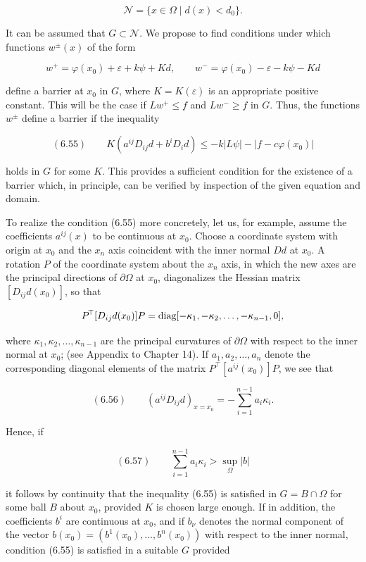 \[
\mathcal{N} = \{x \in \Omega \mid d(x) < d_0\}.
\]

It can be assumed that $G \subset \mathcal{N}$. We propose to find conditions under which functions
$w^\pm(x)$ of the form

\[
w^+ = \varphi(x_0) + \varepsilon + k\psi + Kd, \qquad w^- = \varphi(x_0) - \varepsilon - k\psi - Kd
\]

define a barrier at $x_0$ in $G$, where $K = K(\varepsilon)$ is an appropriate positive constant. This
will be the case if $Lw^+ \leq f$ and $Lw^- \geq f$ in $G$. Thus, the functions $w^\pm$ define a barrier
if the inequality

\[
(6.55) \qquad K(a^{ij}D_{ij}d + b^iD_i d) \leq -k|L\psi| - |f - c\varphi(x_0)|
\]

holds in $G$ for some $K$. This provides a sufficient condition for the existence of a barrier which, in
principle, can be verified by inspection of the given equation and domain.

To realize the condition (6.55) more concretely, let us, for example, assume the coefficients
$a^{ij}(x)$ to be continuous at $x_0$. Choose a coordinate system with origin at $x_0$ and the
$x_n$ axis coincident with the inner normal $Dd$ at $x_0$. A rotation $P$ of the coordinate system
about the $x_n$ axis, in which the new axes are the principal directions of $\partial\Omega$ at $x_0$,
diagonalizes the Hessian matrix $[D_{ij}d(x_0)]$, so that

\[
P^{\!\top}[D_{ij}d(x_0)]P = \operatorname{diag}[-\kappa_1, -\kappa_2, \ldots, -\kappa_{n-1}, 0],
\]

where $\kappa_1, \kappa_2, \ldots, \kappa_{n-1}$ are the principal curvatures of $\partial\Omega$ with respect to the
inner normal at $x_0$; (see Appendix to Chapter 14). If $a_1, a_2, \ldots, a_n$ denote the
corresponding diagonal elements of the matrix $P^{\!\top}[a^{ij}(x_0)]P$, we see that

\[
(6.56) \qquad \left(a^{ij}D_{ij}d\right)_{x=x_0} = -\sum_{i=1}^{n-1} a_i\kappa_i.
\]

Hence, if

\[
(6.57) \qquad \sum_{i=1}^{n-1} a_i\kappa_i > \sup_{\Omega} |b|
\]

it follows by continuity that the inequality (6.55) is satisfied in $G = B \cap \Omega$ for
some ball $B$ about $x_0$, provided $K$ is chosen large enough. If in addition, the coefficients
$b^i$ are continuous at $x_0$, and if $b_\nu$ denotes the normal component of the vector
$b(x_0) = (b^1(x_0), \ldots, b^n(x_0))$ with respect to the inner normal, condition (6.55)
is satisfied in a suitable $G$ provided

